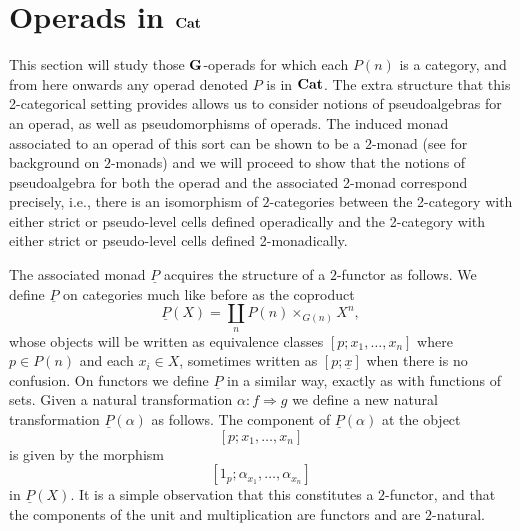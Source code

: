 \section{Operads in $\mathbf{Cat}$}

This section will study those $\mathbf{G}$-operads for which each $P(n)$ is a category, and from here onwards any operad denoted $P$ is in $\mathbf{Cat}$. The extra structure that this 2-categorical setting provides allows us to consider notions of pseudoalgebras for an operad, as well as pseudomorphisms of operads. The induced monad associated to an operad of this sort can be shown to be a $2$-monad (see \cite{KS} for background on $2$-monads) and we will proceed to show that the notions of pseudoalgebra for both the operad and the associated 2-monad correspond precisely, i.e., there is an isomorphism of $2$-categories between the 2-category with either strict or pseudo-level cells defined operadically and the 2-category with either strict or pseudo-level cells defined 2-monadically.

The associated monad $\underline{P}$ acquires the structure of a $2$-functor as follows. We define $\underline{P}$ on categories much like before as  the coproduct
	\[
		\underline{P}(X) = \coprod_n P(n) \times_{G(n)} X^n,
	\]
whose objects will be written as equivalence classes $[p;x_1,\ldots,x_n]$ where $p \in P(n)$ and each $x_i \in X$, sometimes written as $[p;\underline{x}]$ when there is no confusion. On functors we define $\underline{P}$ in a similar way, exactly as with functions of sets. Given a natural transformation $\alpha \colon f \Rightarrow g$ we define a new natural transformation $\underline{P}(\alpha)$ as follows. The component of $\underline{P}(\alpha)$ at the object
	\[
		[p;x_1,\ldots,x_n]
	\]
is given by the morphism
	\[
		[1_p;\alpha_{x_1},\ldots,\alpha_{x_n}]
	\]
in $\underline{P}(X)$.
It is a simple observation that this constitutes a $2$-functor, and that the components of the unit and multiplication are functors and are $2$-natural.

